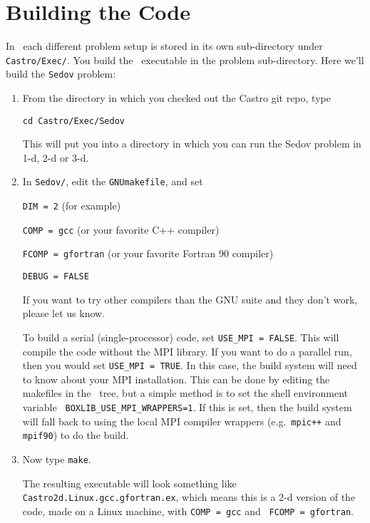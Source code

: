 
\section{Building the Code}

In \castro\ each different problem setup is stored in its own
sub-directory under {\tt Castro/Exec/}.  You build the
\castro\ executable in the problem sub-directory.  Here we'll
build the {\tt Sedov} problem:

\begin{enumerate}

\item From the directory in which you checked out the Castro git repo,
  type
\begin{verbatim}
cd Castro/Exec/Sedov
\end{verbatim}
This will put you into a directory in which you can run the Sedov
problem in 1-d, 2-d or 3-d.

\item In {\tt Sedov/}, edit the {\tt GNUmakefile}, and set

{\tt DIM = 2} (for example)

{\tt COMP = gcc} (or your favorite C++ compiler)

{\tt FCOMP = gfortran} (or your favorite Fortran 90 compiler)

{\tt DEBUG = FALSE}

If you want to try other compilers than the GNU suite and they don't
work, please let us know.

To build a serial (single-processor) code, set {\tt USE\_MPI = FALSE}.
This will compile the code without the MPI library.  If you want to do
a parallel run, then you would set {\tt USE\_MPI = TRUE}.  In this
case, the build system will need to know about your MPI installation.
This can be done by editing the makefiles in the \boxlib\ tree, but a
simple method is to set the shell environment variable {\tt
  BOXLIB\_USE\_MPI\_WRAPPERS=1}.  If this is set, then the build
system will fall back to using the local MPI compiler wrappers
(e.g.\ {\tt mpic++} and {\tt mpif90}) to do the build.

\item Now type {\tt make}.

  The resulting executable will look something like {\tt
    Castro2d.Linux.gcc.gfortran.ex}, which means this is a 2-d version
  of the code, made on a Linux machine, with {\tt COMP = gcc} and {\tt
    FCOMP = gfortran}.

\end{enumerate}

